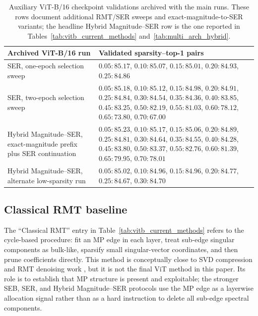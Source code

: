 \documentclass[11pt]{article}
\theoremstyle{plain}
\theoremstyle{definition}
\theoremstyle{remark}
\newcommand{\1}{\mathbf{1}}
\begin{document}
\begin{table}[ht]
\centering
\caption{Auxiliary ViT-B/16 checkpoint validations archived with the main runs.  These rows document additional RMT/SER sweeps and exact-magnitude-to-SER variants; the headline Hybrid Magnitude--SER row is the one reported in Tables~\ref{tab:vitb_current_methods} and~\ref{tab:multi_arch_hybrid}.}
\label{tab:vitb_auxiliary_checkpoint_ledger}
\scriptsize
\setlength{\tabcolsep}{3pt}
\begin{tabularx}{\textwidth}{p{4.2cm}X}
\toprule
Archived ViT-B/16 run & Validated sparsity--top-1 pairs \\
\midrule
SER, one-epoch selection sweep
& \(0.05:85.17\), \(0.10:85.07\), \(0.15:85.01\), \(0.20:84.93\), \(0.25:84.86\) \\
SER, two-epoch selection sweep
& \(0.05:85.18\), \(0.10:85.12\), \(0.15:84.98\), \(0.20:84.91\), \(0.25:84.84\), \(0.30:84.54\), \(0.35:84.36\), \(0.40:83.85\), \(0.45:83.25\), \(0.50:82.19\), \(0.55:81.03\), \(0.60:78.12\), \(0.65:73.80\), \(0.70:67.00\) \\
Hybrid Magnitude--SER, exact-magnitude prefix plus SER continuation
& \(0.05:85.23\), \(0.10:85.17\), \(0.15:85.06\), \(0.20:84.89\), \(0.25:84.81\), \(0.30:84.64\), \(0.35:84.55\), \(0.40:84.28\), \(0.45:83.80\), \(0.50:83.37\), \(0.55:82.76\), \(0.60:81.39\), \(0.65:79.95\), \(0.70:78.01\) \\
Hybrid Magnitude--SER, alternate low-sparsity run
& \(0.05:85.02\), \(0.10:84.96\), \(0.15:84.96\), \(0.20:84.77\), \(0.25:84.67\), \(0.30:84.70\) \\
\bottomrule
\end{tabularx}
\end{table}

\subsection{Classical RMT baseline}
\label{subsec:classical_rmt}

The ``Classical RMT'' entry in Table~\ref{tab:vitb_current_methods} refers to the cycle-based procedure: fit an MP edge in each layer, treat sub-edge singular components as bulk-like, sparsify small singular-vector coordinates, and then prune coefficients directly.  This method is conceptually close to SVD compression and RMT denoising work \cite{shmalo2023deep,staats2022boundary}, but it is not the final ViT method in this paper.  Its role is to establish that MP structure is present and exploitable; the stronger SEB, SER, and Hybrid Magnitude--SER protocols use the MP edge as a layerwise allocation signal rather than as a hard instruction to delete all sub-edge spectral components.
\end{document}
